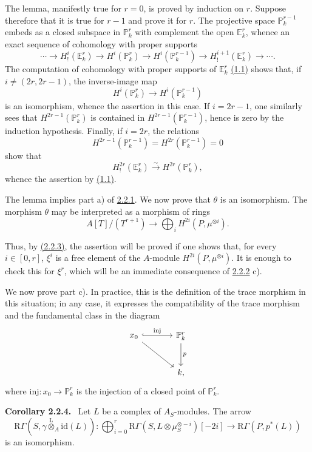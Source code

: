 \documentclass[11pt]{article}
\newenvironment{statement}[1]{\par\medskip\noindent\textbf{#1.}\ }{\par\medskip}
\providecommand{\lten}{\overset{\mathrm L}{\otimes}}
\providecommand{\lten}{\overset{\mathrm L}{\otimes}}
\providecommand{\lten}{\overset{\mathrm L}{\otimes}}
\providecommand{\lten}{\overset{\mathrm L}{\otimes}}
\providecommand{\lten}{\overset{\mathrm L}{\otimes}}
\providecommand{\lten}{\overset{\mathrm L}{\otimes}}
\providecommand{\lten}{\overset{\mathrm L}{\otimes}}
\begin{document}
The lemma, manifestly true for $r=0$, is proved by induction on $r$. Suppose therefore that it is true for $r-1$ and prove it for $r$. The projective space $\mathbb P_k^{r-1}$ embeds as a closed subspace in $\mathbb P_k^r$ with complement the open $\mathbb E_k^r$, whence an exact sequence of cohomology with proper supports
\[
\cdots\longrightarrow H_!^i(\mathbb E_k^r)\longrightarrow H^i(\mathbb P_k^r)
\longrightarrow H^i(\mathbb P_k^{r-1})\longrightarrow H_!^{i+1}(\mathbb E_k^r)\longrightarrow\cdots.
\]
The computation of cohomology with proper supports of $\mathbb E_k^r$ \hyperref[sga5:VII:proposition:1.1]{(1.1)} shows that, if $i\ne(2r,2r-1)$, the inverse-image map
\[
H^i(\mathbb P_k^r)\longrightarrow H^i(\mathbb P_k^{r-1})
\]
is an isomorphism, whence the assertion in this case. If $i=2r-1$, one similarly sees that $H^{2r-1}(\mathbb P_k^r)$ is contained in $H^{2r-1}(\mathbb P_k^{r-1})$, hence is zero by the induction hypothesis. Finally, if $i=2r$, the relations
\[
H^{2r-1}(\mathbb P_k^{r-1})=H^{2r}(\mathbb P_k^{r-1})=0
\]
show that
\[
H_!^{2r}(\mathbb E_k^r)\xrightarrow{\sim}H^{2r}(\mathbb P_k^r),
\]
whence the assertion by \hyperref[sga5:VII:proposition:1.1]{(1.1)}.

The lemma implies part a) of \hyperref[sga5:VII:theorem:2.2.1]{2.2.1}. We now prove that $\theta$ is an isomorphism. The morphism $\theta$ may be interpreted as a morphism of rings
\[
A[T]/(T^{r+1})\longrightarrow\bigoplus_i H^{2i}(P,\mu^{\otimes i}).
\]


Thus, by \hyperref[sga5:VII:lemma:2.2.3]{(2.2.3)}, the assertion will be proved if one shows that, for every $i\in[0,r]$, $\xi^i$ is a free element of the $A$-module $H^{2i}(P,\mu^{\otimes i})$. It is enough to check this for $\xi^r$, which will be an immediate consequence of \hyperref[sga5:VII:proposition:2.2.2]{2.2.2} c).

We now prove part c). In practice, this is the definition of the trace morphism in this situation; in any case, it expresses the compatibility of the trace morphism and the fundamental class in the diagram
\[
\begin{tikzcd}[column sep=large,row sep=large]
x_0 \arrow[r,hook,"\mathrm{inj}"] \arrow[dr] & \mathbb P^r_k \arrow[d,"p"]\\
& k ,
\end{tikzcd}
\]
where $\mathrm{inj}:x_0\to \mathbb P^r_k$ is the injection of a closed point of $\mathbb P^r_k$.

\label{sga5:VII:corollary:2.2.4}\begin{statement}{Corollary 2.2.4}
Let $L$ be a complex of $A_S$-modules. The arrow
\[
\mathrm R\Gamma(S,\gamma\lten_A\mathrm{id}(L)):
\bigoplus_{i=0}^r \mathrm R\Gamma(S,L\otimes\mu_S^{\otimes -i})[-2i]
\longrightarrow
\mathrm R\Gamma(P,p^*(L))
\]
is an isomorphism.
\end{statement}
\end{document}
